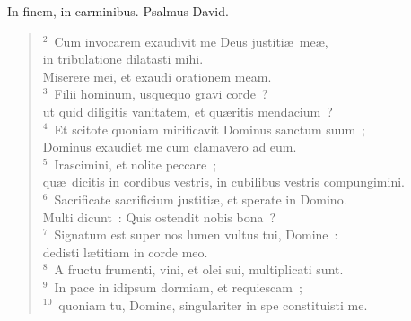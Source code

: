 \lettrine[lines=3,image=true,loversize=0.05,lraise=-0.03]{I}{}n finem, in carminibus. Psalmus David.
\begin{flushleft}\begin{verse}\vspace{6pt}${}^{2}$~Cum invocarem exaudivit me Deus justiti\ae\ me\ae ,\\ in tribulatione dilatasti mihi.\\ Miserere mei, et exaudi orationem meam.\\
${}^{3}$~Filii hominum, usquequo gravi corde~?\\ ut quid diligitis vanitatem, et qu\ae ritis mendacium~?\\
${}^{4}$~Et scitote quoniam mirificavit Dominus sanctum suum~;\\ Dominus exaudiet me cum clamavero ad eum.\\
${}^{5}$~Irascimini, et nolite peccare~;\\ qu\ae\ dicitis in cordibus vestris, in cubilibus vestris compungimini.\\
${}^{6}$~Sacrificate sacrificium justiti\ae , et sperate in Domino.\\ Multi dicunt~: Quis ostendit nobis bona~?\\
${}^{7}$~Signatum est super nos lumen vultus tui, Domine~:\\ dedisti l\ae titiam in corde meo.\\
${}^{8}$~A fructu frumenti, vini, et olei sui, multiplicati sunt.\\
${}^{9}$~In pace in idipsum dormiam, et requiescam~;\\
${}^{10}$~quoniam tu, Domine, singulariter in spe constituisti me.\end{verse}\end{flushleft}



